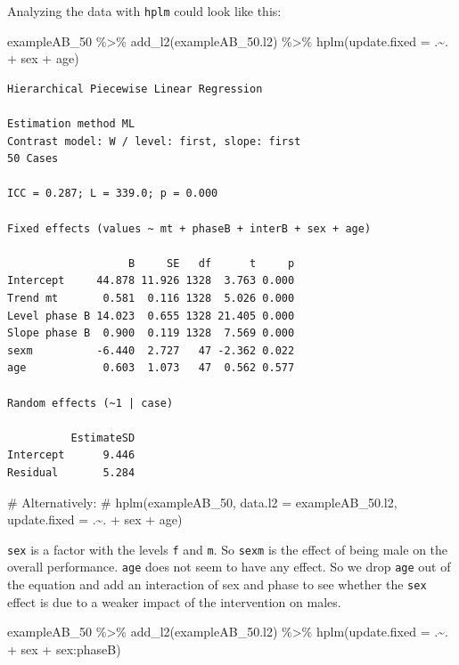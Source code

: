 \documentclass[
  letterpaper,
  DIV=11,
  numbers=noendperiod]{scrreprt}
\newenvironment{Shaded}{\begin{snugshade}}{\end{snugshade}}
\newcommand{\AttributeTok}[1]{\textcolor[rgb]{0.40,0.45,0.13}{#1}}
\newcommand{\CommentTok}[1]{\textcolor[rgb]{0.37,0.37,0.37}{#1}}
\newcommand{\FunctionTok}[1]{\textcolor[rgb]{0.28,0.35,0.67}{#1}}
\newcommand{\NormalTok}[1]{\textcolor[rgb]{0.00,0.23,0.31}{#1}}
\newcommand{\SpecialCharTok}[1]{\textcolor[rgb]{0.37,0.37,0.37}{#1}}
\begin{document}
Analyzing the data with \texttt{hplm} could look like this:

\begin{Shaded}
\begin{Highlighting}[]
\NormalTok{exampleAB\_50 }\SpecialCharTok{\%\textgreater{}\%}
  \FunctionTok{add\_l2}\NormalTok{(exampleAB\_50.l2) }\SpecialCharTok{\%\textgreater{}\%}
  \FunctionTok{hplm}\NormalTok{(}\AttributeTok{update.fixed =}\NormalTok{ .}\SpecialCharTok{\textasciitilde{}}\NormalTok{. }\SpecialCharTok{+}\NormalTok{ sex }\SpecialCharTok{+}\NormalTok{ age)}
\end{Highlighting}
\end{Shaded}

\begin{verbatim}
Hierarchical Piecewise Linear Regression

Estimation method ML 
Contrast model: W / level: first, slope: first
50 Cases

ICC = 0.287; L = 339.0; p = 0.000

Fixed effects (values ~ mt + phaseB + interB + sex + age)

                   B     SE   df      t     p
Intercept     44.878 11.926 1328  3.763 0.000
Trend mt       0.581  0.116 1328  5.026 0.000
Level phase B 14.023  0.655 1328 21.405 0.000
Slope phase B  0.900  0.119 1328  7.569 0.000
sexm          -6.440  2.727   47 -2.362 0.022
age            0.603  1.073   47  0.562 0.577

Random effects (~1 | case)

          EstimateSD
Intercept      9.446
Residual       5.284
\end{verbatim}

\begin{Shaded}
\begin{Highlighting}[]
\CommentTok{\# Alternatively:}
\CommentTok{\# hplm(exampleAB\_50, data.l2 = exampleAB\_50.l2, update.fixed = .\textasciitilde{}. + sex + age)}
\end{Highlighting}
\end{Shaded}

\texttt{sex} is a factor with the levels \texttt{f} and \texttt{m}. So
\texttt{sexm} is the effect of being male on the overall performance.
\texttt{age} does not seem to have any effect. So we drop \texttt{age}
out of the equation and add an interaction of sex and phase to see
whether the \texttt{sex} effect is due to a weaker impact of the
intervention on males.

\begin{Shaded}
\begin{Highlighting}[]
\NormalTok{exampleAB\_50 }\SpecialCharTok{\%\textgreater{}\%}
  \FunctionTok{add\_l2}\NormalTok{(exampleAB\_50.l2) }\SpecialCharTok{\%\textgreater{}\%}
  \FunctionTok{hplm}\NormalTok{(}\AttributeTok{update.fixed =}\NormalTok{ .}\SpecialCharTok{\textasciitilde{}}\NormalTok{. }\SpecialCharTok{+}\NormalTok{ sex }\SpecialCharTok{+}\NormalTok{ sex}\SpecialCharTok{:}\NormalTok{phaseB)}
\end{Highlighting}
\end{Shaded}
\end{document}
